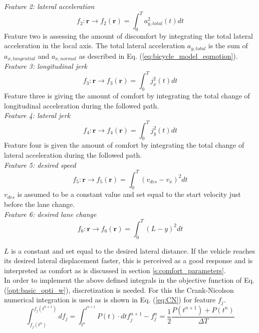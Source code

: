 \textit{Feature 2: lateral acceleration}
\begin{equation}\label{eq:flat_acc}
f_{2}:\bm{r}\xrightarrow{}f_2(\bm{r})=\int_{0}^{T}a_{y,total}^{2}(t) dt
\end{equation}
Feature two is assessing the amount of discomfort by integrating the total lateral acceleration in the local axis. The total lateral acceleration  $a_{y,total} $ is the sum of  $ a_{x,tangential}$ and $a_{x,normal}$ as described in Eq. (\ref{eq:bicycle_model_eqmotion}).\\

\textit{Feature 3: longitudinal jerk}
\begin{equation}\label{eq:flong_jerk}
f_{3}:\bm{r}\xrightarrow{}f_3(\bm{r})=\int_{0}^{T}j_{x}^{2}(t) dt
\end{equation}
Feature three is giving the amount of comfort by integrating the total change of longitudinal acceleration during the followed path. \\

\textit{Feature 4: lateral jerk}
\begin{equation}\label{eq:flat_jerk}
f_{4}:\bm{r}\xrightarrow{}f_4(\bm{r})=\int_{0}^{T}j_y^{2}(t) dt
\end{equation}
Feature four is given the amount of comfort by integrating the total change of lateral acceleration during the followed path. \\

\textit{Feature 5: desired speed}
\begin{equation}\label{eq:des_speed}
f_{5}:\bm{r}\xrightarrow{}f_5(\bm{r})=\int_{0}^{T}(v_{des}-v_x)^2 dt
\end{equation}
$v_{des}$ is assumed to be a constant value and set equal to the start velocity just before the lane change.\\

\textit{Feature 6: desired lane change}
\begin{equation}\label{eq:des_lane_change}
f_{6}:\bm{r}\xrightarrow{}f_6(\bm{r})=\int_{0}^{T}(L-y)^2 dt
\end{equation}

$L$ is a constant and set equal to the desired lateral distance. If the vehicle reaches its desired lateral displacement faster, this is perceived as a good response and is interpreted as comfort as is discussed in section \ref{s:comfort_parameters}.\\

In order to implement the above defined integrals in the objective function of Eq. (\ref{opt:basic_opti_w}), discretization is needed. For this the Crank-Nicolson numerical integration is used as is shown in Eq. (\ref{eq:CN}) for feature $f_j$. 
\begin{subequations}\label{eq:CN}
	\begin{equation}
	\int_{f_j(t^n)}^{f_j(t^{n+1})}df_j=\int_{t^n}^{t^{n+1}} P(t) \cdot dt	
	\end{equation}
	\begin{equation}
	f_j^{n+1} -f_j^{n} = \frac{1}{2}\frac{P(t^{n+1})+P(t^n)}{\Delta T}
	\end{equation}
\end{subequations}\\

